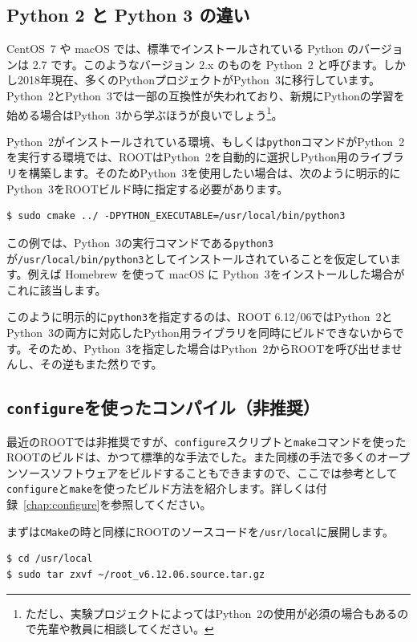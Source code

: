 \subsection{Python 2 と Python 3 の違い}

CentOS~7 や macOS では、標準でインストールされている Python のバージョンは 2.7 です。このようなバージョン 2.x のものを Python~2 と呼びます。しかし2018年現在、多くのPythonプロジェクトがPython~3に移行しています。Python~2とPython~3では一部の互換性が失われており、新規にPythonの学習を始める場合はPython~3から学ぶほうが良いでしょう\footnote{ただし、実験プロジェクトによってはPython~2の使用が必須の場合もあるので先輩や教員に相談してください。}。

Python~2がインストールされている環境、もしくは\texttt{python}コマンドがPython~2を実行する環境では、ROOTはPython~2を自動的に選択しPython用のライブラリを構築します。そのためPython~3を使用したい場合は、次のように明示的にPython~3をROOTビルド時に指定する必要があります。

\begin{lstlisting}
$ sudo cmake ../ -DPYTHON_EXECUTABLE=/usr/local/bin/python3
\end{lstlisting}

この例では、Python~3の実行コマンドである\texttt{python3}が\texttt{/usr/local/bin/python3}としてインストールされていることを仮定しています。例えば Homebrew を使って macOS に Python~3をインストールした場合がこれに該当します。

このように明示的に\texttt{python3}を指定するのは、ROOT 6.12/06ではPython~2とPython~3の両方に対応したPython用ライブラリを同時にビルドできないからです。そのため、Python~3を指定した場合はPython~2からROOTを呼び出せませんし、その逆もまた然りです。

\subsection{\texttt{configure}を使ったコンパイル（非推奨）}
\label{subsec:compile_configure}

最近のROOTでは非推奨ですが、\texttt{configure}スクリプトと\texttt{make}コマンドを使ったROOTのビルドは、かつて標準的な手法でした。また同様の手法で多くのオープンソースソフトウェアをビルドすることもできますので、ここでは参考として\texttt{configure}と\texttt{make}を使ったビルド方法を紹介します。詳しくは付録~\ref{chap:configure}を参照してください。

まずは\texttt{CMake}の時と同様にROOTのソースコードを\texttt{/usr/local}に展開します。
\begin{lstlisting}[language=bash]
$ cd /usr/local
$ sudo tar zxvf ~/root_v6.12.06.source.tar.gz
\end{lstlisting}

